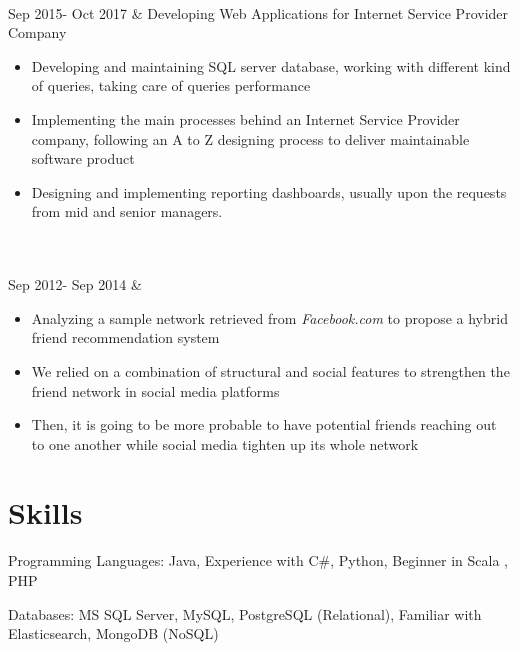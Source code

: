 \documentclass[
    changecolor={111, 156, 45}
]{cv-roald}
\begin{document}
\begin{tabularcv}
\\
Sep 2015- Oct 2017 &	
                \newline Developing Web Applications for Internet Service Provider Company
                \begin{itemize}
                  \item Developing and maintaining SQL server database, working with different kind of queries, taking care of queries performance
                  \item Implementing the main processes behind an Internet Service Provider company, following an A to Z designing process to deliver maintainable software product 
                  \item Designing and implementing reporting dashboards, usually upon the requests from mid and senior managers.
                \end{itemize} 
              	\\
\\
Sep 2012- Sep 2014 &	 \newline
\begin{itemize}
	\item Analyzing a sample network retrieved from \emph{Facebook.com} to propose a hybrid friend recommendation system
	\item We relied on a combination of structural and social features to strengthen the friend network in social media platforms 
	\item Then, it is going to be more probable to have potential friends reaching out to one another while social media tighten up its whole network
\end{itemize}  

\end{tabularcv}   

\section*{Skills}

Programming Languages: Java, Experience with C\#, Python, Beginner in Scala , PHP

Databases: MS SQL Server, MySQL, PostgreSQL (Relational), Familiar with Elasticsearch, MongoDB (NoSQL) 
\end{document}
